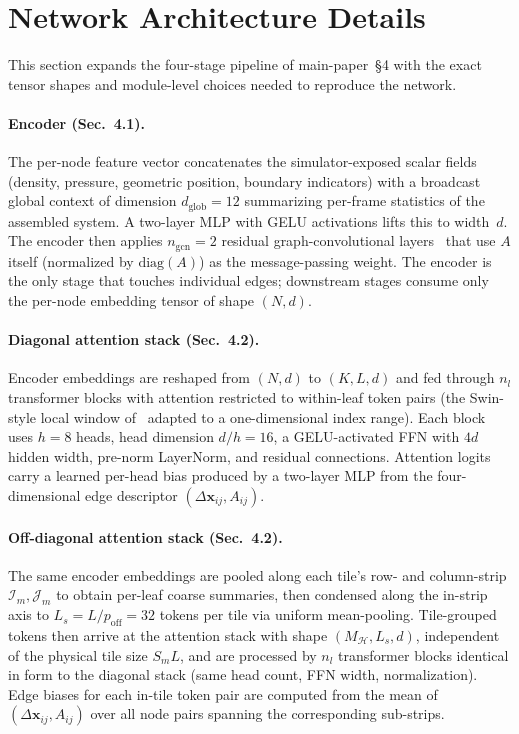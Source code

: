 \documentclass[acmtog,anonymous,review]{acmart}
\begin{document}
\section{Network Architecture Details}
\label{supp:architecture}

This section expands the four-stage pipeline of main-paper~\S4 with the exact
tensor shapes and module-level choices needed to reproduce the network.

\paragraph{Encoder (Sec.~4.1).}
The per-node feature vector concatenates the simulator-exposed scalar fields
(density, pressure, geometric position, boundary indicators) with a broadcast
global context of dimension $d_{\mathrm{glob}}\!=\!12$ summarizing per-frame
statistics of the assembled system. A two-layer MLP with GELU activations lifts
this to width~$d$. The encoder then applies $n_{\mathrm{gcn}}\!=\!2$ residual
graph-convolutional layers~\cite{kipf2017semi} that use $A$ itself (normalized by
$\mathrm{diag}(A)$) as the message-passing weight. The encoder is the only stage
that touches individual edges; downstream stages consume only the per-node
embedding tensor of shape $(N, d)$.

\paragraph{Diagonal attention stack (Sec.~4.2).}
Encoder embeddings are reshaped from $(N, d)$ to $(K, L, d)$ and fed through $n_l$
transformer blocks with attention restricted to within-leaf token pairs (the
Swin-style local window of~\cite{Liu2021swin,vaswani2017attention} adapted to a
one-dimensional index range). Each block uses $h\!=\!8$ heads, head dimension
$d/h\!=\!16$, a GELU-activated FFN with $4d$ hidden width, pre-norm LayerNorm, and
residual connections. Attention logits carry a learned per-head bias produced by
a two-layer MLP from the four-dimensional edge descriptor
$(\Delta\mathbf{x}_{ij}, A_{ij})$.

\paragraph{Off-diagonal attention stack (Sec.~4.2).}
The same encoder embeddings are pooled along each tile's row- and column-strip
$\mathcal{I}_m, \mathcal{J}_m$ to obtain per-leaf coarse summaries, then
condensed along the in-strip axis to $L_s\!=\!L/p_{\mathrm{off}}\!=\!32$ tokens
per tile via uniform mean-pooling. Tile-grouped tokens then arrive at the
attention stack with shape $(M_{\mathcal{H}}, L_s, d)$, independent of the
physical tile size $S_mL$, and are processed by $n_l$ transformer blocks
identical in form to the diagonal stack (same head count, FFN width,
normalization). Edge biases for each in-tile token pair are computed from the
mean of $(\Delta\mathbf{x}_{ij}, A_{ij})$ over all node pairs spanning the
corresponding sub-strips.
\end{document}
